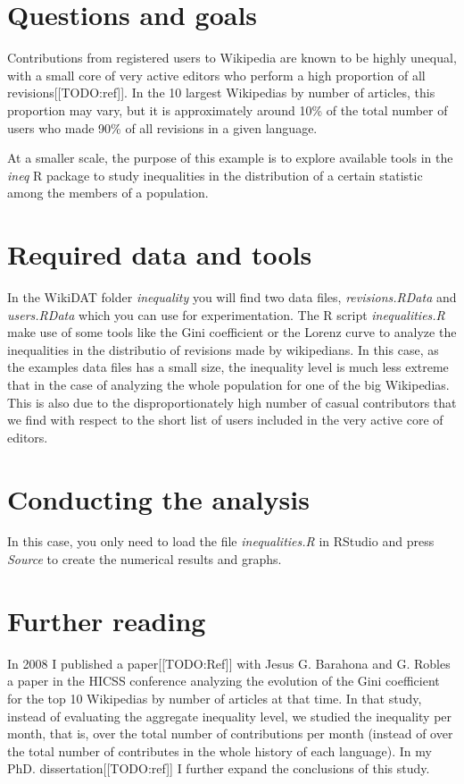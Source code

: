 \section{Questions and goals}
Contributions from registered users to Wikipedia are known to be highly unequal,
with a small core of very active editors who perform a high proportion of all 
revisions[[TODO:ref]]. In the 10 largest Wikipedias by number of articles, this
proportion may vary, but it is approximately around 10\% of the total number of
users who made 90\% of all revisions in a given language.

At a smaller scale, the purpose of this example is to explore available tools in
the \textit{ineq} R package to study inequalities in the distribution of a certain
statistic among the members of a population.

\section{Required data and tools}
In the WikiDAT folder \textit{inequality} you will find two data files, \textit{revisions.RData}
and \textit{users.RData} which you can use for experimentation. The R script
\textit{inequalities.R} make use of some tools like the Gini coefficient or the
Lorenz curve to analyze the inequalities in the distributio of revisions made
by wikipedians. In this case, as the examples data files has a small size, the
inequality level is much less extreme that in the case of analyzing the whole
population for one of the big Wikipedias. This is also due to the disproportionately
high number of casual contributors that we find with respect to the short list of
users included in the very active core of editors.

\section{Conducting the analysis}
In this case, you only need to load the file \textit{inequalities.R} in
RStudio and press \textit{Source} to create the numerical results and graphs.


\section{Further reading}
In 2008 I published a paper[[TODO:Ref]] with Jesus G. Barahona and G. Robles a paper in the
HICSS conference analyzing the evolution of the Gini coefficient for the top
10 Wikipedias by number of articles at that time. In that study, instead of
evaluating the aggregate inequality level, we studied the inequality per month,
that is, over the total number of contributions per month (instead of over the
total number of contributes in the whole history of each language). In my PhD.
dissertation[[TODO:ref]] I further expand the conclusions of this study. 


